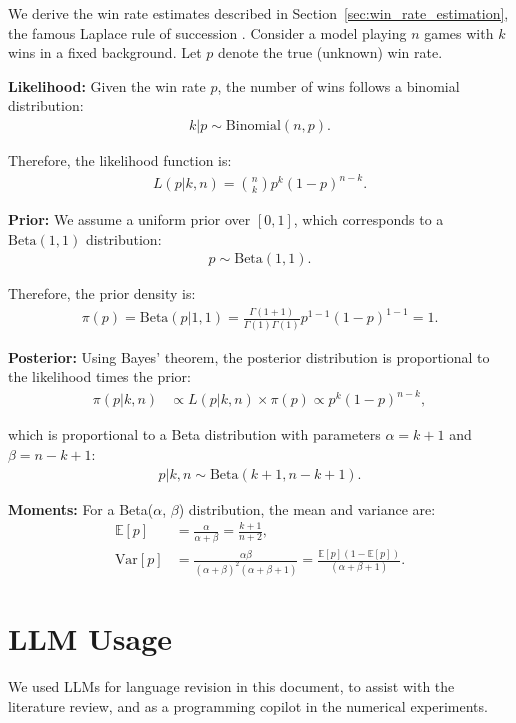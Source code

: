 \documentclass{article}
\begin{document}
    We derive the win rate estimates described in Section~\ref{sec:win_rate_estimation}, the famous Laplace rule of succession \cite{Laplace1812}. Consider a model playing $n$ games with $k$ wins in a fixed background. Let $p$ denote the true (unknown) win rate.

    \textbf{Likelihood:} Given the win rate $p$, the number of wins follows a binomial distribution:
    \begin{align}
    k | p \sim \text{Binomial}(n, p).
    \end{align}

    Therefore, the likelihood function is:
    \begin{align}
    L(p | k, n) = \binom{n}{k} p^k (1-p)^{n-k}.
    \end{align}

    \textbf{Prior:} We assume a uniform prior over $[0,1]$, which corresponds to a $\text{Beta}(1,1)$ distribution:
    \begin{align}
    p \sim  \text{Beta}(1, 1).
    \end{align}

    Therefore, the prior density is:
    \begin{align}
    \pi(p) = \text{Beta}(p | 1, 1) = \frac{\Gamma(1+1)}{\Gamma(1)\Gamma(1)} p^{1-1}(1-p)^{1-1} = 1.
    \end{align}

    \textbf{Posterior:} Using Bayes' theorem, the posterior distribution is proportional to the likelihood times the prior:
    \begin{align}
    \pi(p | k, n) &\propto L(p | k, n) \times \pi(p)\propto p^k (1-p)^{n-k},
    \end{align}

    which is proportional to a Beta distribution with parameters $\alpha = k + 1$ and $\beta = n - k + 1$:
    \begin{align}
    p | k, n \sim \text{Beta}(k + 1, n - k + 1).
    \end{align}

    \textbf{Moments:} For a Beta($\alpha$, $\beta$) distribution, the mean and variance are:
    \begin{align}
    \mathbb{E}[p] &= \frac{\alpha}{\alpha + \beta} = \frac{k + 1}{n + 2},\\
    \text{Var}[p] &= \frac{\alpha\beta}{(\alpha + \beta)^2(\alpha + \beta + 1)} = \frac{\mathbb{E}[p](1-\mathbb{E}[p])}{(\alpha+\beta+1)}.
    \end{align}

    \section*{LLM Usage}
    
    We used LLMs for language revision in this document, to assist with the literature review, and as a programming copilot in the numerical experiments.
\end{document}
